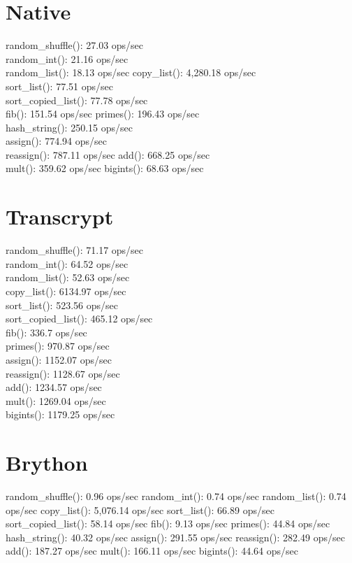 \label{notes__03010-python-web.md}
\chapter{Native}\label{notes__03010-python-web.md__native}

random\_shuffle(): 27.03 ops/sec\\
random\_int(): 21.16 ops/sec\\
random\_list(): 18.13 ops/sec
copy\_list(): 4,280.18 ops/sec\\
sort\_list(): 77.51 ops/sec\\
sort\_copied\_list(): 77.78 ops/sec\\
fib(): 151.54 ops/sec
primes(): 196.43 ops/sec\\
hash\_string(): 250.15 ops/sec\\
assign(): 774.94 ops/sec\\
reassign(): 787.11 ops/sec
add(): 668.25 ops/sec\\
mult(): 359.62 ops/sec
bigints(): 68.63 ops/sec

\chapter{Transcrypt}\label{notes__03010-python-web.md__transcrypt}

random\_shuffle(): 71.17 ops/sec\\
random\_int(): 64.52 ops/sec\\
random\_list(): 52.63 ops/sec\\
copy\_list(): 6134.97 ops/sec\\
sort\_list(): 523.56 ops/sec\\
sort\_copied\_list(): 465.12 ops/sec\\
fib(): 336.7 ops/sec\\
primes(): 970.87 ops/sec\\
assign(): 1152.07 ops/sec\\
reassign(): 1128.67 ops/sec\\
add(): 1234.57 ops/sec\\
mult(): 1269.04 ops/sec\\
bigints(): 1179.25 ops/sec

\chapter{Brython}\label{notes__03010-python-web.md__brython}

random\_shuffle(): 0.96 ops/sec
random\_int(): 0.74 ops/sec
random\_list(): 0.74 ops/sec
copy\_list(): 5,076.14 ops/sec
sort\_list(): 66.89 ops/sec
sort\_copied\_list(): 58.14 ops/sec
fib(): 9.13 ops/sec
primes(): 44.84 ops/sec
hash\_string(): 40.32 ops/sec
assign(): 291.55 ops/sec
reassign(): 282.49 ops/sec
add(): 187.27 ops/sec
mult(): 166.11 ops/sec
bigints(): 44.64 ops/sec

